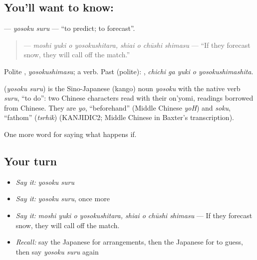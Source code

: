 \subsection*{You'll want to know: }
\textbf{} — \emph{yosoku suru} — \textquotedblleft{}to predict; to forecast\textquotedblright{}.

\begin{quote}
\textbf{   } — \emph{moshi yuki o yosokushitara, shiai o chūshi shimasu} — \textquotedblleft{}If they forecast snow, they will call off the match.\textquotedblright{}
\end{quote}

Polite \textbf{}, \emph{yosokushimasu}; a  verb. Past (polite): \textbf{  }, \emph{chichi ga yuki o yosokushimashita}.

\begin{cousinweb}
\textbf{} (\emph{yosoku suru}) is the Sino-Japanese (kango) noun \emph{yosoku} with the native verb \emph{suru}, \textquotedblleft{}to do\textquotedblright{}: two Chinese characters read with their on'yomi, readings borrowed from Chinese. They are \emph{yo}, \textquotedblleft{}beforehand\textquotedblright{} (Middle Chinese \emph{yoH}) and \emph{soku}, \textquotedblleft{}fathom\textquotedblright{} (\emph{tsrhik}) (KANJIDIC2; Middle Chinese in Baxter's transcription).
\end{cousinweb}

\begin{grammarlens}[title={What you've built}]
One more word for saying what happens if.
\end{grammarlens}

\subsection*{Your turn}
\begin{itemize}
\raggedright
  \item \emph{Say it:} \emph{yosoku suru}
  \item \emph{Say it:} \emph{yosoku suru}, once more
  \item \emph{Say it:} \emph{moshi yuki o yosokushitara, shiai o chūshi shimasu} — If they forecast snow, they will call off the match.
  \item \emph{Recall:} say the Japanese for arrangements, then the Japanese for to guess, then say \emph{yosoku suru} again
\end{itemize}

